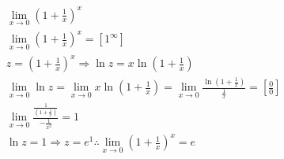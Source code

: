 \begin{ex}
\begin{align}
&\lim_{x\rightarrow 0} \left(1+\frac{1}{x}\right)^{x}\nonumber\\
&\lim_{x\rightarrow 0} \left(1+\frac{1}{x}\right)^{x}=[1^{\infty}]\nonumber\\
&z=\left(1+\frac{1}{x}\right)^{x} \Rightarrow \ln{z}= x\ln{\left(1+\frac{1}{x}\right)}\nonumber\\
&\lim_{x\rightarrow 0} \ln{z}=\lim_{x\rightarrow 0} x\ln\left(1+\frac{1}{x}\right)=\lim_{x\rightarrow 0} \frac{\ln{\left(1+\frac{1}{x}\right)}}{\frac{1}{x}}=\left[\frac{0}{0}\right]\nonumber\\
&\lim_{x\rightarrow 0} \frac{\frac{1}{\left(1+\frac{1}{x}\right)}}{-\frac{1}{x^2}}=1\nonumber\\
&\ln{z}=1 \Rightarrow z=e^1 \therefore \lim_{x\rightarrow 0} \left(1+\frac{1}{x}\right)^{x}=e\nonumber
\end{align}
\end{ex}
